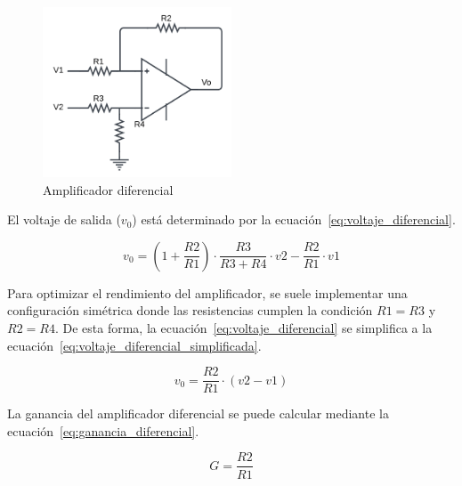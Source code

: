             \begin{figure}[H]
                \centering
                \includegraphics[width=0.5\textwidth]{img/Marco/Amplificador_Diferencial.png}
                \caption[Amplificador diferencial]{Amplificador diferencial\footnotemark}
                \label{fig:Amplificador_Diferencial}
            \end{figure}

            El voltaje de salida ($v_0$) está determinado por la ecuación~\ref{eq:voltaje_diferencial}.

            \begin{equation}
                \label{eq:voltaje_diferencial}
                v_0 = (1 + \frac{R2}{R1}) \cdot \frac{R3}{R3 + R4} \cdot v2 - \frac{R2}{R1} \cdot v1
            \end{equation}

            Para optimizar el rendimiento del amplificador, se suele implementar una configuración simétrica donde las resistencias cumplen la condición $R1 = R3$ y $R2 = R4$. De esta forma, la ecuación~\ref{eq:voltaje_diferencial} se simplifica a la ecuación~\ref{eq:voltaje_diferencial_simplificada}.

            \begin{equation}
                \label{eq:voltaje_diferencial_simplificada}
                v_0 = \frac{R2}{R1} \cdot (v2 - v1)
            \end{equation}

            La ganancia del amplificador diferencial se puede calcular mediante la ecuación~\ref{eq:ganancia_diferencial}.

            \begin{equation}
                \label{eq:ganancia_diferencial}
                G = \frac{R2}{R1}
            \end{equation}

